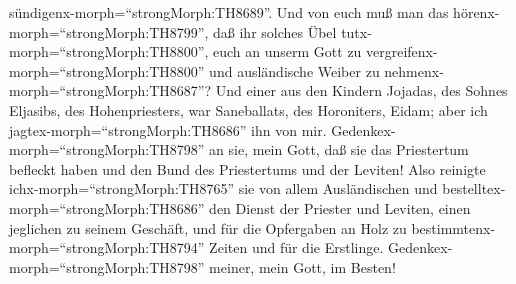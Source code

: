 sündigenx-morph=``strongMorph:TH8689''.  Und von euch muß
man das hörenx-morph=``strongMorph:TH8799'', daß ihr solches Übel
tutx-morph=``strongMorph:TH8800'', euch an unserm Gott zu
vergreifenx-morph=``strongMorph:TH8800'' und ausländische Weiber zu
nehmenx-morph=``strongMorph:TH8687''?  Und einer aus den
Kindern Jojadas, des Sohnes Eljasibs, des Hohenpriesters, war
Saneballats, des Horoniters, Eidam; aber ich
jagtex-morph=``strongMorph:TH8686'' ihn von mir. 
Gedenkex-morph=``strongMorph:TH8798'' an sie, mein Gott, daß sie das
Priestertum befleckt haben und den Bund des Priestertums und der
Leviten!  Also reinigte ichx-morph=``strongMorph:TH8765''
sie von allem Ausländischen und bestelltex-morph=``strongMorph:TH8686''
den Dienst der Priester und Leviten, einen jeglichen zu seinem Geschäft,
 und für die Opfergaben an Holz zu
bestimmtenx-morph=``strongMorph:TH8794'' Zeiten und für die Erstlinge.
Gedenkex-morph=``strongMorph:TH8798'' meiner, mein Gott, im Besten!

